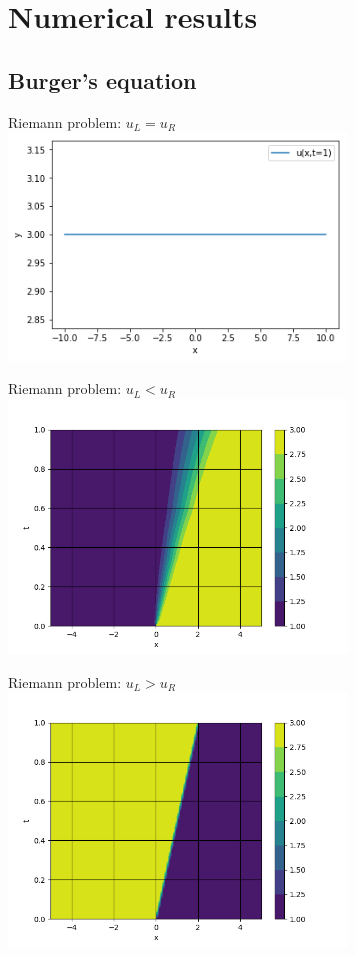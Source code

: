 \documentclass{beamer}
\begin{document}
    \section{Numerical results}
        \subsection{Burger's equation}
            \begin{frame}{Riemann problem: $u_L = u_R$}
                \includegraphics[width=9cm]{Burgers331.png}
            \end{frame}
            \begin{frame}{Riemann problem: $u_L < u_R$}
                \includegraphics[width=9cm]{Burgers13.png}
            \end{frame}
            \begin{frame}{Riemann problem: $u_L > u_R$}
                \includegraphics[width=9cm]{Burgers31.png}
            \end{frame}
\end{document}

